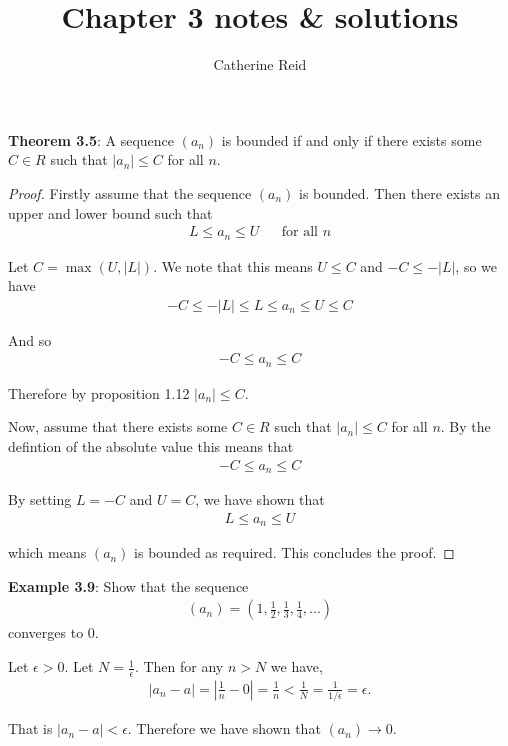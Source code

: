 \documentclass{article}
\author{Catherine Reid}
\title{Chapter 3 notes \& solutions}
\date{}
\begin{document}
\maketitle

\textbf{Theorem 3.5}: A sequence $(a_n)$ is bounded if and only if there exists some $C \in R$ such that $|a_n| \leq C$ for all $n$.

\begin{proof}
	Firstly assume that the sequence $(a_n)$ is bounded. Then there exists an upper and lower bound such that
	\begin{align*}
		L \leq a_n \leq U &  & \text{for all }n
	\end{align*}

	Let $C = \max(U, |L|)$. We note that this means $U \leq C$ and $-C \leq -|L|$, so we have
	\begin{align*}
		-C \leq -|L| \leq L \leq a_n \leq U \leq C
	\end{align*}

	And so
	\begin{align*}
		-C \leq a_n \leq C
	\end{align*}

	Therefore by proposition 1.12 $|a_n| \leq C$.

	Now, assume that there exists some $C \in R$ such that $|a_n| \leq C$ for all $n$.  By the defintion of the absolute value this means that
	\begin{align*}
		-C \leq a_n \leq C
	\end{align*}

	By setting $L = -C$ and $U = C$, we have shown that
	\begin{align*}
		L \leq a_n \leq U
	\end{align*}

	which means $(a_n)$ is bounded as required. This concludes the proof.
\end{proof}

\textbf{Example 3.9}: Show that the sequence
\begin{align*}
	(a_n) = \left(1, \frac{1}{2}, \frac{1}{3}, \frac{1}{4},...\right)
\end{align*}
converges to 0.

Let $\epsilon > 0$. Let $N = \tfrac{1}{\epsilon}$. Then for any $n > N$ we have,
\begin{align*}
	|a_n - a| = |\frac{1}{n} - 0| = \frac{1}{n} < \frac{1}{N} = \frac{1}{1/\epsilon} = \epsilon.
\end{align*}

That is $|a_n - a| < \epsilon$. Therefore we have shown that $(a_n) \rightarrow 0$.
\end{document}
